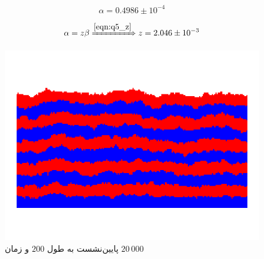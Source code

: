 \documentclass[11pt, a4paper]{article}
\begin{document}
\begin{equation}
  \alpha = 0.4986 \pm 10^{-4}
  \label{eqn:q5_z}
\end{equation}

\begin{equation}
  \alpha = z \beta
  \xRightarrow{\eqref{eqn:q5_z}}
  z = 2.046 \pm 10^{-3}
\end{equation}

\begin{figure}[h]
  \centering
  \includegraphics[width=.5\textwidth]{q5_201_20000.png}
  \caption{پایین‌نشست به طول $200$ و زمان $20\,000$}
  \label{fig:q5_201_20000}
\end{figure}
\end{document}
